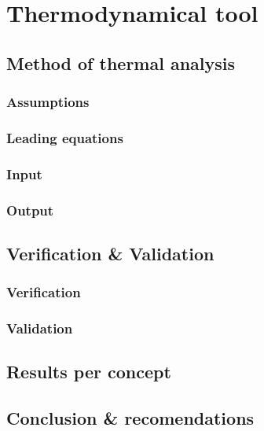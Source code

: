 \section{Thermodynamical tool}
\label{ch:thermtool}


\subsection{Method of thermal analysis}

\subsubsection{Assumptions}

\subsubsection{Leading equations}

\subsubsection{Input}

\subsubsection{Output}



\subsection{Verification & Validation}

\subsubsection{Verification}

\subsubsection{Validation}



\subsection{Results per concept}



\subsection{Conclusion & recomendations}
